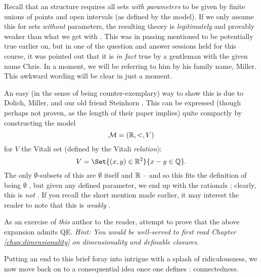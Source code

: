 \begin{remark}
  Recall that an \om structure requires all  sets \emph{with parameters} to be given by finite unions of points and open intervals (as defined by the model). If we only assume this for sets  \emph{without} parameters, the resulting theory is \emph{legitimately} and provably weaker than what we get with \omy. This was in passing mentioned to be potentially true earlier on, but in one of the question and answer sessions held for this course, it was pointed out that it is \emph{in fact} true by a gentleman with the given name Chris. In a moment, we will be referring to him by his family name, Miller. This awkward wording will be clear in just a moment.

  An easy (in the sense of being counter-exemplary) way to show this is due to Dolich, Miller, and our old friend Steinhorn \cite{dolich_structures_2009}. This can be expressed (though perhaps not proven, as the length of their paper implies) quite compactly by constructing the model
  $$
    \mathcal{M} = (\mathbb{R}, <, V)
  $$
  for $V$ the Vitali set (defined by the Vitali \emph{relation}):
  $$
    V = \Set{(x, y) \in \R^2}{x - y \in \Q}.
  $$
  The only $\emptyset$- subsets of this are $\emptyset$ itself and $\mathbb{R}$ -- and so this fits the definition of being $\emptyset$ \om, but given any defined parameter, we end up with the rationals ; clearly, this is \emph{not} \om. If you recall the short mention made earlier, it may interest the reader to note that this is \emph{weakly} \om.

  \begin{exercise}
    As an exercise of \emph{this} author to the reader, attempt to prove that the above expansion admits QE. \textit{Hint: You would be well-served to first read Chapter \ref{chap:dimensionality} on dimensionality and definable closures.}
  \end{exercise}
\end{remark}

Putting an end to this brief foray into intrigue with a splash of ridiculousness, we now move back on to a consequential idea once one defines \cds: connectedness.

